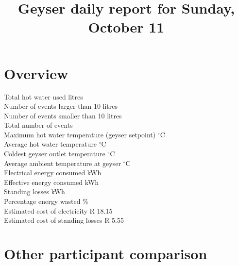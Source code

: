 \documentclass{article}\usepackage[]{graphicx}\usepackage[]{color}
\title{Geyser daily report for Sunday, October 11} %
\date{\vspace{-5ex}} %
\begin{document}
\maketitle %






\section{Overview}



Total hot water used  litres\\
Number of events larger than 10 litres \\
Number of events smaller than 10 litres \\
Total number of events \\

Maximum hot water temperature (geyser setpoint)  $^{\circ}$C\\
Average hot water temperature  $^{\circ}$C\\
Coldest geyser outlet temperature  $^{\circ}$C\\
Average ambient temperature at geyser  $^{\circ}$C\\

Electrical energy consumed  kWh\\
Effective energy consumed  kWh\\
Standing losses  kWh\\
Percentage energy wasted  \%\\
Estimated cost of electricity \dotfill  R 18.15\\
Estimated cost of standing losses \dotfill  R 5.55\\



\section{Other participant comparison}
\end{document}

